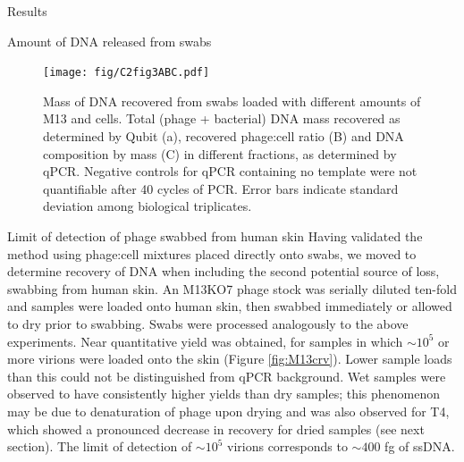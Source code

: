 \documentclass[oneside,12pt,final]{sty/ucthesis-CA2012}
\begin{document}
\begin{mainmatter}
\begin{section}{Results}
\begin{subsection}{Amount of DNA released from swabs}
\begin{figure}
\centering
\texttt{[image: fig/C2fig3ABC.pdf]}
\caption{Mass of DNA recovered from swabs loaded with different amounts of M13 and cells. Total (phage + bacterial) DNA mass recovered as determined by Qubit (a), recovered phage:cell ratio (B) and DNA composition by mass (C) in different fractions, as determined by qPCR. Negative controls for qPCR containing no template were not quantifiable after 40 cycles of PCR. Error bars indicate standard deviation among biological triplicates.}
\label{fig:dnarec}
\end{figure}
\end{subsection}

\begin{subsection}{Limit of detection of phage swabbed from human skin}
Having validated the method using phage:cell mixtures placed directly onto swabs, we moved to determine recovery of DNA when including the second potential source of loss, swabbing from human skin. An M13KO7 phage stock was serially diluted ten-fold and samples were loaded onto human skin, then swabbed immediately or allowed to dry prior to swabbing. Swabs were processed analogously to the above experiments. Near quantitative yield was obtained, for samples in which $\sim 10^{5}$ or more virions were loaded onto the skin (Figure \ref{fig:M13crv}). Lower sample loads than this could not be distinguished from qPCR background. Wet samples were observed to have consistently higher yields than dry samples; this phenomenon may be due to denaturation of phage upon drying and was also observed for T4, which showed a pronounced decrease in recovery for dried samples (see next section). The limit of detection of $\sim 10^{5}$ virions corresponds to $\sim 400$ fg of ssDNA.


\end{subsection}
\end{section}
\end{mainmatter}
\end{document}
